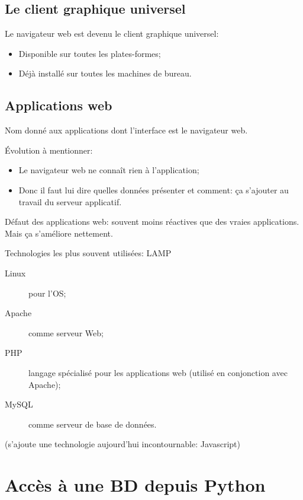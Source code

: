 \subsection{Le client graphique universel}

Le navigateur web est devenu le client graphique universel:

\begin{itemize}
\item Disponible sur toutes les plates-formes;
\item Déjà installé sur toutes les machines de bureau.
\end{itemize}

\subsection{Applications web}
Nom donné aux applications dont l'interface est le navigateur web.

Évolution à mentionner:
\begin{itemize}
\item Le navigateur web ne connaît rien à l'application;
\item Donc il faut lui dire quelles données présenter et comment:
  ça s'ajouter au travail du serveur applicatif.
\end{itemize}

Défaut des applications web: souvent moins réactives que des vraies
applications. Mais ça s'améliore nettement.

Technologies les plus souvent utilisées: LAMP
\begin{description}
\item[Linux] pour l'OS;
\item[Apache] comme serveur Web;
\item[PHP] langage spécialisé pour les applications web (utilisé en
  conjonction avec Apache);
\item[MySQL] comme serveur de base de données.
\end{description}
(s'ajoute une technologie aujourd'hui incontournable: Javascript)

\section{Accès à une BD depuis Python}



